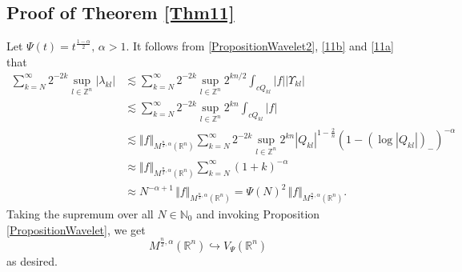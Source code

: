 \documentclass[11pt, a4paper,leqno]{amsart}
\newtheorem{theorem}{Theorem}
\theoremstyle{plain}
\numberwithin{equation}{section}
\theoremstyle{definition}
\theoremstyle{remark}
\begin{document}
\subsection{Proof of Theorem \ref{Thm11}\label{Section3}}
%
%
%
%
%
%
%
 Let $\Psi(t) = t^{\frac{1-\alpha}{2}}, \, \alpha > 1$. It follows from \eqref{PropositionWavelet2}, \eqref{11b} and \eqref{11a}
that
\begin{align*}
\sum_{k=N}^{\infty}2^{-2k}\sup_{l\in\mathbb{Z}^{n}}|\lambda
_{k l}|  &  \lesssim\sum_{k=N}^{\infty}2^{-2k}\sup_{l\in\mathbb{Z}^{n}}2^{kn/2}\int_{cQ_{kl}}|f||\Upsilon_{k l}|\\
&  \lesssim\sum_{k=N}^{\infty}2^{-2k}\sup_{l\in\mathbb{Z}^{n}}2^{kn}%
\int_{cQ_{kl}}|f|\\
&  \lesssim\Vert f\Vert_{M^{\frac{n}{2},\alpha}(\mathbb{R}^{n})}\sum
_{k=N}^{\infty}2^{-2k}\sup_{l\in\mathbb{Z}^{n}}2^{kn}|Q_{kl}|^{1-\frac{2}{n}%
}(1-(\log|Q_{kl}|)_{-})^{-\alpha}\\
&  \approx\Vert f\Vert_{M^{\frac{n}{2},\alpha}(\mathbb{R}^{n})}\sum
_{k=N}^{\infty}(1+k)^{-\alpha}\\
&  \approx N^{-\alpha+1}\,\Vert f\Vert_{M^{\frac{n}{2},\alpha}(\mathbb{R}%
^{n})}=\Psi(N)^{2}\,\Vert f\Vert_{M^{\frac{n}{2},\alpha}(\mathbb{R}^{n})}.
\end{align*}
Taking the supremum over all $N\in\mathbb{N}_{0}$ and invoking Proposition
\ref{PropositionWavelet}, we get
\begin{equation}
M^{\frac{n}{2},\alpha}(\mathbb{R}^{n})\hookrightarrow V_{\Psi}(\mathbb{R}^{n})
\label{fromMtoV}%
\end{equation}
as desired.
\end{document}
